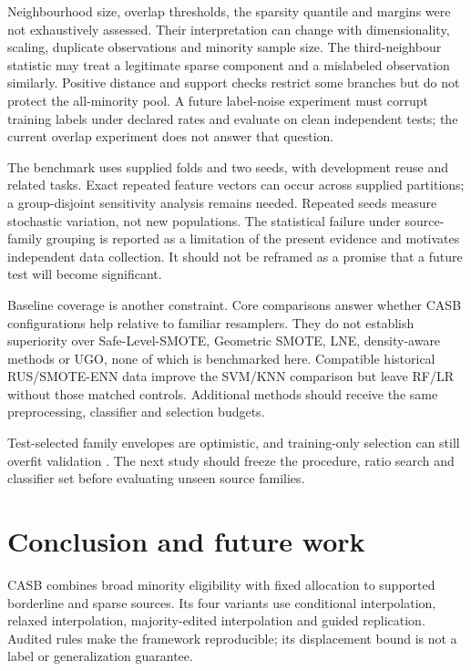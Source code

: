 \documentclass[conference]{IEEEtran}
\begin{document}
Neighbourhood size, overlap thresholds, the sparsity quantile and margins were not exhaustively assessed. Their interpretation can change with dimensionality, scaling, duplicate observations and minority sample size. The third-neighbour statistic may treat a legitimate sparse component and a mislabeled observation similarly. Positive distance and support checks restrict some branches but do not protect the all-minority pool. A future label-noise experiment must corrupt training labels under declared rates and evaluate on clean independent tests; the current overlap experiment does not answer that question.

The benchmark uses supplied folds and two seeds, with development reuse and related tasks. Exact repeated feature vectors can occur across supplied partitions; a group-disjoint sensitivity analysis remains needed. Repeated seeds measure stochastic variation, not new populations. The statistical failure under source-family grouping is reported as a limitation of the present evidence and motivates independent data collection. It should not be reframed as a promise that a future test will become significant.

Baseline coverage is another constraint. Core comparisons answer whether CASB configurations help relative to familiar resamplers. They do not establish superiority over Safe-Level-SMOTE, Geometric SMOTE, LNE, density-aware methods or UGO, none of which is benchmarked here. Compatible historical RUS/SMOTE-ENN data improve the SVM/KNN comparison but leave RF/LR without those matched controls. Additional methods should receive the same preprocessing, classifier and selection budgets.

Test-selected family envelopes are optimistic, and training-only selection can still overfit validation \citep{cawley2010}. The next study should freeze the procedure, ratio search and classifier set before evaluating unseen source families.

\section{Conclusion and future work}
CASB combines broad minority eligibility with fixed allocation to supported borderline and sparse sources. Its four variants use conditional interpolation, relaxed interpolation, majority-edited interpolation and guided replication. Audited rules make the framework reproducible; its displacement bound is not a label or generalization guarantee.
\end{document}
